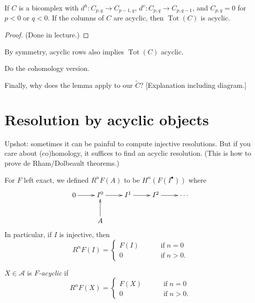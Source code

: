 \begin{lemma}
\label{lemma-assembly-homological}
If $C$ is a bicomplex with
$d^h:C_{p,q} \to C_{p-1,q}$,
$d^v:C_{p,q}\to C_{p,q-1}$,
and $C_{p,q}=0$ for $p<0$ or $q<0$.
If the columns of $C$ are acyclic,
then $\operatorname{Tot}(C)$ is acyclic.
\end{lemma}

\begin{proof}
(Done in lecture.)
\end{proof}

\begin{remark}
\label{remark-rows-acyclic}
By symmetry, acyclic rows also implies
$\operatorname{Tot}(C)$ acyclic.
\end{remark}

\begin{exercise}
\label{exercise-balancing-cohomology}
Do the cohomology version.
\end{exercise}

\noindent
Finally, why does the lemma apply to our
$\widetilde{C}$? [Explanation including
diagram.]

\section{Resolution by acyclic objects}
\label{section-resolution-by-acyclic}

\noindent Upshot: sometimes it can be
painful to compute injective resolutions.
But if you care about (co)homology, it
suffices to find an acyclic resolution.
(This is how to prove de Rham/Dolbeault
theorems.)

\medskip\noindent
For $F$ left exact, we defined $R^nF(A)$ to 
be $H^n(F(I^\bullet))$ where
$$
\xymatrix{
0 \ar[r] & I^0 \ar[r]& I^1 \ar[r]& I^2
\ar[r]&\cdots\\
&A \ar[u]
}
$$
In particular, if $I$ is injective, then
$$
R^nF(I)
=
\begin{cases}
F(I)\qquad &\operatorname{if} n=0 \\
0\qquad &\operatorname{if} n>0.
\end{cases}
$$
\begin{definition}
\label{definition-f-acyclic}
$X \in \mathcal{A}$ is {\it $F$-acyclic} 
if
$$
R^nF(X)
=
\begin{cases}
F(X)\qquad &\operatorname{if}n=0 \\
0\qquad &\operatorname{if} n>0.
\end{cases}
$$
\end{definition}

